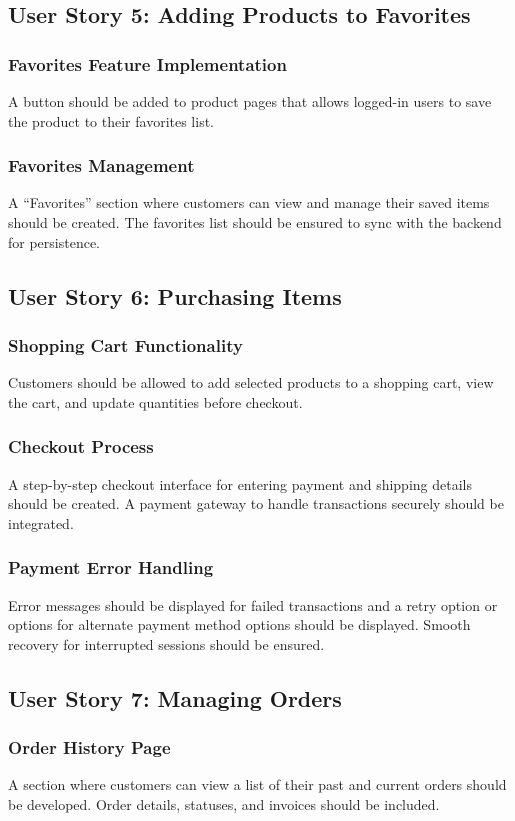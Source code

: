 \documentclass[twoside,a4paper,journal]{IEEEtran}
\begin{document}
\subsection{User Story 5: Adding Products to Favorites}
\subsubsection{Favorites Feature Implementation}
A button should be added to product pages that allows logged-in users to save
the product to their favorites list.
\subsubsection{Favorites Management}
A ``Favorites'' section where customers can view and manage their saved
items should be created.
The favorites list should be ensured to sync with the backend for persistence.

\subsection{User Story 6: Purchasing Items}
\subsubsection{Shopping Cart Functionality}
Customers should be allowed to add selected products to a shopping cart,
view the cart, and update quantities before checkout.
\subsubsection{Checkout Process}
A step-by-step checkout interface for entering payment and shipping
details should be created.
A payment gateway to handle transactions securely should be integrated.
\subsubsection{Payment Error Handling}
Error messages should be displayed for failed transactions and a retry option or
options for alternate payment method options should be displayed.
Smooth recovery for interrupted sessions should be ensured.

\subsection{User Story 7: Managing Orders}
\subsubsection{Order History Page}
A section where customers can view a list of their past and current
orders should be developed.
Order details, statuses, and invoices should be included.
\end{document}
